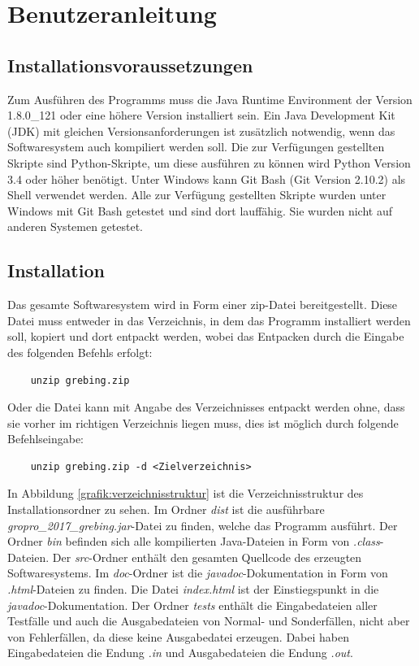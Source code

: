\chapter{Benutzeranleitung}
\label{Benutzeranleitung}

\lstset{
	breaklines=true,
	frame=single,
	language=bash,
}

\section{Installationsvoraussetzungen}
Zum Ausführen des Programms muss die Java Runtime Environment der Version 1.8.0\_121 oder eine höhere Version installiert sein. Ein Java Development Kit (JDK) mit gleichen Versionsanforderungen ist zusätzlich notwendig, wenn das Softwaresystem auch kompiliert werden soll.
Die zur Verfügungen gestellten Skripte sind Python-Skripte, um diese ausführen zu können wird Python Version 3.4 oder höher benötigt.
Unter Windows kann Git Bash (Git Version 2.10.2) als Shell verwendet werden.
Alle zur Verfügung gestellten Skripte wurden unter Windows mit Git Bash getestet und sind dort lauffähig. Sie wurden nicht auf anderen Systemen getestet.

\section{Installation}
Das gesamte Softwaresystem wird in Form einer zip-Datei bereitgestellt. Diese Datei muss entweder in das Verzeichnis, in dem das Programm installiert werden soll, kopiert und dort entpackt werden, wobei das Entpacken durch die Eingabe des folgenden Befehls erfolgt:

\begin{lstlisting}
	unzip grebing.zip
\end{lstlisting}

Oder die Datei kann mit Angabe des Verzeichnisses entpackt werden ohne, dass sie vorher im richtigen Verzeichnis liegen muss, dies ist möglich durch folgende Befehlseingabe:

\begin{lstlisting}
	unzip grebing.zip -d <Zielverzeichnis>
\end{lstlisting}

In Abbildung \ref{grafik:verzeichnisstruktur} ist die Verzeichnisstruktur des Installationsordner zu sehen. Im Ordner \textit{dist} ist die ausführbare \textit{gropro_2017_grebing.jar}-Datei zu finden, welche das Programm ausführt. Der Ordner \textit{bin} befinden sich alle kompilierten Java-Dateien in Form von \textit{.class}-Dateien. Der \textit{src}-Ordner enthält den gesamten Quellcode des erzeugten Softwaresystems. Im \textit{doc}-Ordner ist die \textit{javadoc}-Dokumentation in Form von \textit{.html}-Dateien zu finden. Die Datei \textit{index.html} ist der Einstiegspunkt in die \textit{javadoc}-Dokumentation. Der Ordner \textit{tests} enthält die Eingabedateien aller Testfälle und auch die Ausgabedateien von Normal- und Sonderfällen, nicht aber von Fehlerfällen, da diese keine Ausgabedatei erzeugen. Dabei haben Eingabedateien die Endung \textit{.in} und Ausgabedateien die Endung \textit{.out}.

